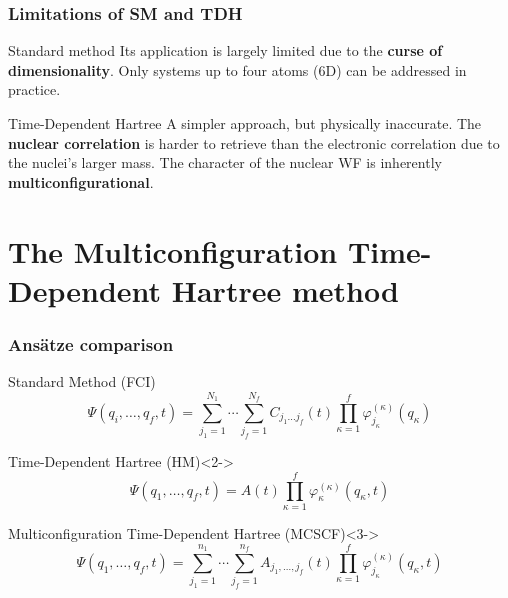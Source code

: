 \documentclass{beamer}
\begin{document}
\begin{frame}
  \frametitle{Limitations of SM and TDH}
  \begin{exampleblock}{Standard method}
    \justifying{}
    Its application is largely limited due to the \textbf{curse of dimensionality}. Only systems up to four atoms (6D) can be addressed in practice.
  \end{exampleblock}
  \begin{block}{Time-Dependent Hartree}
    A simpler approach, but physically inaccurate. The \textbf{nuclear correlation} is harder to retrieve
    than the electronic correlation due to the nuclei's larger mass. The character of the nuclear WF is inherently \textbf{multiconfigurational}. 
  \end{block}
\end{frame}

\section{The Multiconfiguration Time-Dependent Hartree method}\label{mctdh}

\begin{frame}
  \frametitle{Ansätze comparison}
  \vspace{-.3cm}
  \begin{block}{Standard Method (FCI)}
    \begin{equation}
      \Psi(q_i,\ldots, q_f, t) = \sum_{j_1=1}^{N_1}\cdots\sum_{j_f=1}^{N_f} C_{j_1\ldots j_f}(t)\prod_{\kappa=1}^f\varphi^{(\kappa)}_{j_{\kappa}}(q_{\kappa})
    \end{equation}
  \end{block}
  \begin{exampleblock}{Time-Dependent Hartree (HM)}<2->
    \begin{equation}
      \Psi(q_1,\ldots, q_f, t) = A(t)\prod^f_{\kappa=1}\varphi_{\kappa}^{(\kappa)}(q_{\kappa}, t)
    \end{equation}
  \end{exampleblock}

  \begin{alertblock}{Multiconfiguration Time-Dependent Hartree (MCSCF)}<3->
    \begin{equation}
      \Psi(q_1,\ldots, q_f, t) = \sum^{n_1}_{j_1=1}\cdots\sum^{n_f}_{j_f=1}A_{j_1,\ldots,j_f}(t)\prod^{f}_{\kappa=1}\varphi^{(\kappa)}_{j_{\kappa}}(q_{\kappa}, t)
      \label{mctdh_antz}
    \end{equation}
  \end{alertblock}
\end{frame}
\end{document}
